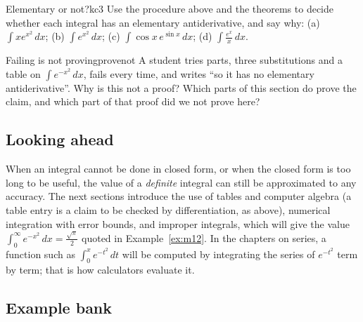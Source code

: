 \documentclass[11pt]{article}
\begin{document}
\begin{kc}{Elementary or not?}{kc3}
Use the procedure above and the theorems to decide whether each integral has an elementary antiderivative, and say why: (a) $\displaystyle\int xe^{x^2}\,dx$; (b) $\displaystyle\int e^{x^2}\,dx$; (c) $\displaystyle\int\cos x\,e^{\sin x}\,dx$; (d) $\displaystyle\int\frac{e^x}x\,dx$.
\end{kc}

\begin{think}{Failing is not proving}{provenot}
A student tries parts, three substitutions and a table on $\int e^{-x^2}\,dx$, fails every time, and writes ``so it has no elementary antiderivative''. Why is this not a proof? Which parts of this section do prove the claim, and which part of that proof did we not prove here?
\end{think}

\subsection*{Looking ahead}

When an integral cannot be done in closed form, or when the closed form is too long to be useful, the value of a \emph{definite} integral can still be approximated to any accuracy. The next sections introduce the use of tables and computer algebra (a table entry is a claim to be checked by differentiation, as above), numerical integration with error bounds, and improper integrals, which will give the value $\int_0^\infty e^{-x^2}\,dx=\frac{\sqrt\pi}2$ quoted in Example~\ref{ex:m12}. In the chapters on series, a function such as $\int_0^xe^{-t^2}\,dt$ will be computed by integrating the series of $e^{-t^2}$ term by term; that is how calculators evaluate it.

\subsection*{Example bank}
\end{document}
